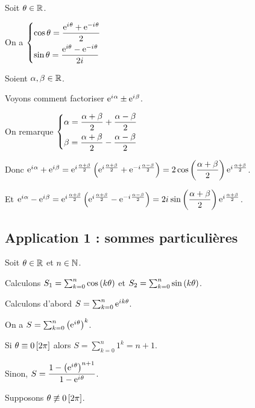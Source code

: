 \begin{prop}
Soit \(\theta\in\mathbb{R}\).

On a \(\begin{dcases}\cos\theta=\dfrac{\mathrm{e}^{i\mkern1mu\theta}+\mathrm{e}^{-i\mkern1mu\theta}}{2} \\ \sin\theta=\dfrac{\mathrm{e}^{i\theta}-\mathrm{e}^{-i\mkern1mu\theta}}{2i\mkern1mu}\end{dcases}\)
\end{prop}

\begin{rem}
Soient \(\alpha,\beta\in\mathbb{R}\).

Voyons comment factoriser \(\mathrm{e}^{i\mkern1mu\alpha}\pm\mathrm{e}^{i\mkern1mu\beta}\).

On remarque \(\begin{dcases}\alpha=\dfrac{\alpha+\beta}{2}+\dfrac{\alpha-\beta}{2} \\ \beta=\dfrac{\alpha+\beta}{2}-\dfrac{\alpha-\beta}{2}\end{dcases}\)

Donc \(\mathrm{e}^{i\mkern1mu\alpha}+\mathrm{e}^{i\mkern1mu\beta}=\mathrm{e}^{i\mkern1mu\frac{\alpha+\beta}{2}}\left(\mathrm{e}^{i\mkern1mu\frac{\alpha+\beta}{2}}+\mathrm{e}^{-i\mkern1mu\frac{\alpha-\beta}{2}}\right)=2\cos\left(\dfrac{\alpha+\beta}{2}\right)\mathrm{e}^{i\mkern1mu\frac{\alpha+\beta}{2}}\).

Et \(\mathrm{e}^{i\mkern1mu\alpha}-\mathrm{e}^{i\mkern1mu\beta}=\mathrm{e}^{i\mkern1mu\frac{\alpha+\beta}{2}}\left(\mathrm{e}^{i\mkern1mu\frac{\alpha+\beta}{2}}-\mathrm{e}^{-i\mkern1mu\frac{\alpha-\beta}{2}}\right)=2i\mkern1mu\sin\left(\dfrac{\alpha+\beta}{2}\right)\mathrm{e}^{i\mkern1mu\frac{\alpha+\beta}{2}}\).
\end{rem}

\subsection{Application 1 : sommes particulières}

Soit \(\theta\in\mathbb{R}\) et \(n\in\mathbb{N}\).

Calculons \(S_1=\sum_{k=0}^n\cos\left(k\theta\right)\) et \(S_2=\sum_{k=0}^n\sin\left(k\theta\right)\).

Calculons d'abord \(S=\sum_{k=0}^n\mathrm{e}^{i\mkern1mu k\theta}\).

On a \(S=\sum_{k=0}^n\left(\mathrm{e}^{i\mkern1mu\theta}\right)^k\).

Si \(\theta\equiv0\left[2\pi\right]\) alors \(S=\sum_{k=0}^n1^k=n+1\).

Sinon, \(S=\dfrac{1-\left(\mathrm{e}^{i\mkern1mu\theta}\right)^{n+1}}{1-\mathrm{e}^{i\mkern1mu\theta}}\).

Supposons \(\theta\not\equiv0\left[2\pi\right]\).

